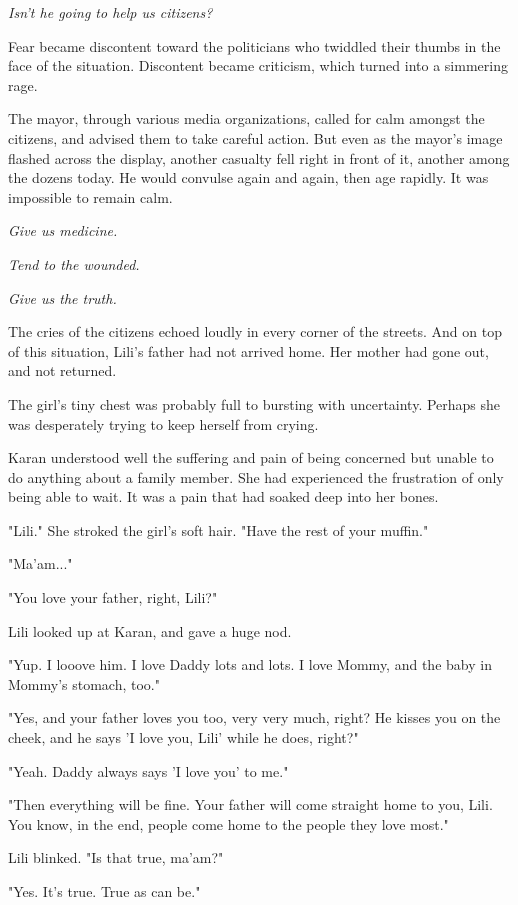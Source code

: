 \emph{Isn't he going to help us citizens?}

Fear became discontent toward the politicians who twiddled their thumbs
in the face of the situation. Discontent became criticism, which turned
into a simmering rage.

The mayor, through various media organizations, called for calm amongst
the citizens, and advised them to take careful action. But even as the
mayor's image flashed across the display, another casualty fell right in
front of it, another among the dozens today. He would convulse again and
again, then age rapidly. It was impossible to remain calm.

\emph{Give us medicine.}

\emph{Tend to the wounded.}

\emph{Give us the truth.}

The cries of the citizens echoed loudly in every corner of the streets.
And on top of this situation, Lili's father had not arrived home. Her
mother had gone out, and not returned.

The girl's tiny chest was probably full to bursting with uncertainty.
Perhaps she was desperately trying to keep herself from crying.~

Karan understood well the suffering and pain of being concerned but
unable to do anything about a family member. She had experienced the
frustration of only being able to wait. It was a pain that had soaked
deep into her bones.

"Lili." She stroked the girl's soft hair. "Have the rest of your
muffin."

"Ma'am..."

"You love your father, right, Lili?"

Lili looked up at Karan, and gave a huge nod.

"Yup. I looove him. I love Daddy lots and lots. I love Mommy, and the
baby in Mommy's stomach, too."

"Yes, and your father loves you too, very very much, right? He kisses
you on the cheek, and he says 'I love you, Lili' while he does, right?"

"Yeah. Daddy always says 'I love you' to me."

"Then everything will be fine. Your father will come straight home to
you, Lili. You know, in the end, people come home to the people they
love most."

Lili blinked. "Is that true, ma'am?"

"Yes. It's true. True as can be."

